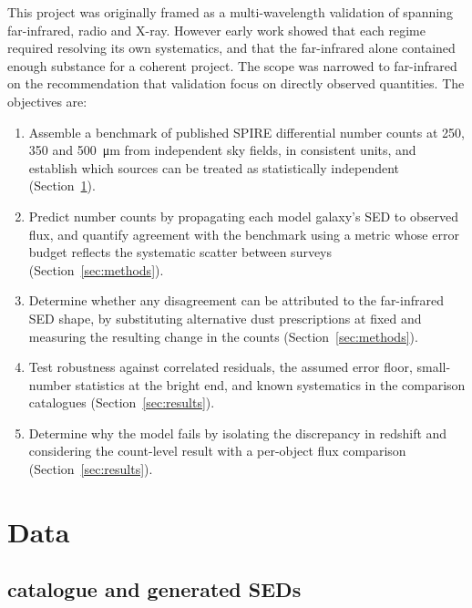 \documentclass[12pt,a4paper]{article}
\begin{document}
This project was originally framed as a multi-wavelength validation of \popcosmos{}
spanning far-infrared, radio and X-ray. However early work showed that each regime
required resolving its own systematics, and that the far-infrared alone contained
enough substance for a coherent project. The scope was narrowed to far-infrared on the
recommendation that validation focus on directly observed quantities. The objectives
are:

\begin{enumerate}
  \item Assemble a benchmark of published SPIRE differential number counts at 250, 350
        and \SI{500}{\um} from independent sky fields, in consistent units, and
        establish which sources can be treated as statistically independent
        (Section~\ref{sec:data}).
  \item Predict \popcosmos{} number counts by propagating each model galaxy's SED to
        observed flux, and quantify agreement with the benchmark using a metric whose
        error budget reflects the systematic scatter between surveys
        (Section~\ref{sec:methods}).
  \item Determine whether any disagreement can be attributed to the far-infrared SED
        shape, by substituting alternative dust prescriptions at fixed \LIR{} and
        measuring the resulting change in the counts (Section~\ref{sec:methods}).
  \item Test robustness against correlated residuals, the assumed error floor,
        small-number statistics at the bright end, and known systematics in the
        comparison catalogues (Section~\ref{sec:results}).
  \item Determine why the model fails by isolating the discrepancy in redshift
        and considering the count-level result with a per-object flux comparison
        (Section~\ref{sec:results}).
\end{enumerate}

\section{Data}
\label{sec:data}

\subsection{\popcosmos{} catalogue and generated SEDs}
\label{sec:data:popcosmos}
\end{document}
